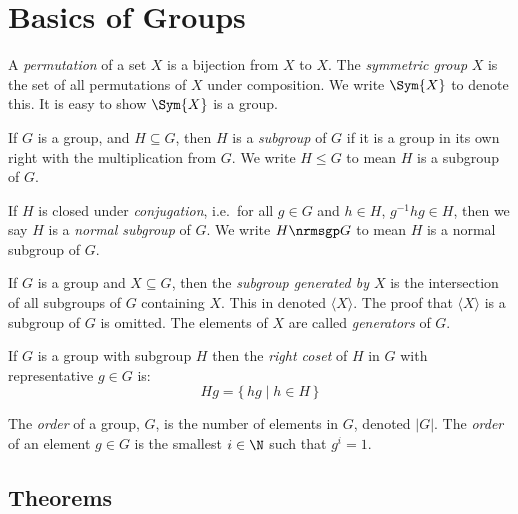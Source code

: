 \section{Basics of Groups}

\begin{definition}
    A \emph{permutation} of a set \(X\) is a bijection from \(X\) to \(X\).
    The \emph{symmetric group} \(X\) is the set of all permutations of \(X\) under composition.
    We write \(\Sym{X}\) to denote this.
    It is easy to show \(\Sym{X}\) is a group.
\end{definition}

\begin{definition}
    If \(G\) is a group, and \(H \subseteq G\), then \(H\) is a \emph{subgroup} of \(G\) if it is a group in its own right with
    the multiplication from \(G\).
    We write \(H \leqslant G\) to mean \(H\) is a subgroup of \(G\).

    If \(H\) is closed under \emph{conjugation}, i.e.\ for all \(g \in G\) and \(h \in H\), \(g^{-1}hg \in H\), then we
    say \(H\) is a \emph{normal subgroup} of \(G\).
    We write \(H \nrmsgp G\) to mean \(H\) is a normal subgroup of \(G\).
\end{definition}

\begin{definition}
    If \(G\) is a group and \(X \subseteq G\), then the \emph{subgroup generated by \(X\)} is the intersection of all
    subgroups of \(G\) containing \(X\).
    This in denoted \(\langle X \rangle\).
    The proof that \(\langle X \rangle\) is a subgroup of \(G\) is omitted.
    The elements of \(X\) are called \emph{generators} of \(G\).
\end{definition}

\begin{definition}
    If \(G\) is a group with subgroup \(H\) then the \emph{right coset} of \(H\) in \(G\) with representative \(g \in
    G\) is:
    \[Hg = \{\,hg \mid h \in H\,\}\]
\end{definition}

\begin{definition}
    The \emph{order} of a group, \(G\), is the number of elements in \(G\), denoted \(|G|\).
    The \emph{order} of an element \(g \in G\) is the smallest \(i \in \N\) such that \(g^i = 1\).
\end{definition}


\subsection{Theorems}

